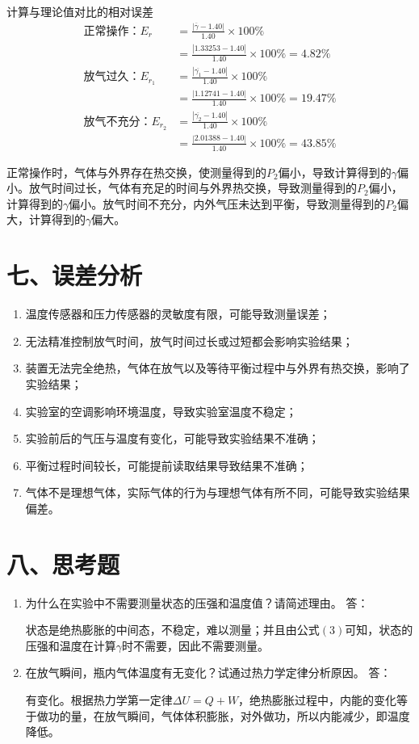 \documentclass[11pt]{article}
\begin{document}
计算与理论值对比的相对误差
\begin{align*}
    \text{正常操作：}E_r&=\frac{|\overline{\gamma}-1.40|}{1.40}\times100\%\\
    &=\frac{|1.33253-1.40|}{1.40}\times100\%=4.82\%\\
    \text{放气过久：}E_{r_1}&=\frac{|\overline{\gamma_1}-1.40|}{1.40}\times100\%\\
    &=\frac{|1.12741-1.40|}{1.40}\times100\%=19.47\%\\
    \text{放气不充分：}E_{r_2}&=\frac{|\overline{\gamma_2}-1.40|}{1.40}\times100\%\\
    &=\frac{|2.01388-1.40|}{1.40}\times100\%=43.85\%
\end{align*}

正常操作时，气体与外界存在热交换，使测量得到的$P_2$偏小，导致计算得到的$\gamma$偏小。放气时间过长，气体有充足的时间与外界热交换，导致测量得到的$P_2$偏小，计算得到的$\gamma$偏小。放气时间不充分，内外气压未达到平衡，导致测量得到的$P_2$偏大，计算得到的$\gamma$偏大。

\section*{七、误差分析}

\begin{enumerate}
    \item 温度传感器和压力传感器的灵敏度有限，可能导致测量误差；
    \item 无法精准控制放气时间，放气时间过长或过短都会影响实验结果；
    \item 装置无法完全绝热，气体在放气以及等待平衡过程中与外界有热交换，影响了实验结果；
    \item 实验室的空调影响环境温度，导致实验室温度不稳定；
    \item 实验前后的气压与温度有变化，可能导致实验结果不准确；
    \item 平衡过程时间较长，可能提前读取结果导致结果不准确；
    \item 气体不是理想气体，实际气体的行为与理想气体有所不同，可能导致实验结果偏差。
\end{enumerate}

\section*{八、思考题}

\begin{enumerate}
    \item 为什么在实验中不需要测量状态\uppercase\expandafter{}的压强和温度值？请简述理由。
    答：

    状态\uppercase\expandafter{}是绝热膨胀的中间态，不稳定，难以测量；并且由公式$(3)$可知，状态\uppercase\expandafter{}的压强和温度在计算$\gamma$时不需要，因此不需要测量。
    \item 在放气瞬间，瓶内气体温度有无变化？试通过热力学定律分析原因。
    答：

    有变化。根据热力学第一定律$\Delta U=Q+W$，绝热膨胀过程中，内能的变化等于做功的量，在放气瞬间，气体体积膨胀，对外做功，所以内能减少，即温度降低。
\end{enumerate}
\end{document}
